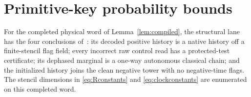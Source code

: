 \section{Primitive-key probability bounds}\label{sec:probability}
\begin{lemma}\label{lem:clockinterface}
For the completed physical word of Lemma~\ref{lem:compiled}, the structural lane has the four conclusions of~\cite[Lemma~12.4]{DMMemory2026}: its decoded positive history is a native history off a finite-stencil flag field; every incorrect raw control read has a protected-test certificate; its dephased marginal is a one-way autonomous classical chain; and the initialized history joins the clean negative tower with no negative-time flags. The stencil dimensions in \eqref{eq:Rconstants} and \eqref{eq:clockconstants} are enumerated on this completed word.
\end{lemma}
